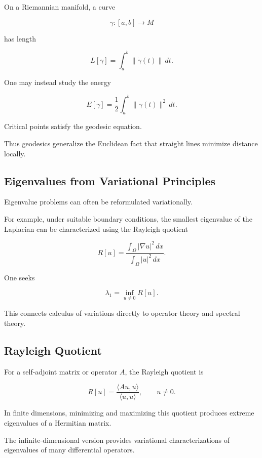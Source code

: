 On a Riemannian manifold, a curve

\[
\gamma:[a,b]\to M
\]

has length

\[
\boxed{
L[\gamma]
=
\int_a^b
\|\dot\gamma(t)\|\,dt.
}
\]

One may instead study the energy

\[
\boxed{
E[\gamma]
=
\frac12
\int_a^b
\|\dot\gamma(t)\|^2\,dt.
}
\]

Critical points satisfy the geodesic equation.

Thus geodesics generalize the Euclidean fact that straight lines minimize
distance locally.

\subsection{Eigenvalues from Variational Principles}
\label{subsec:eigenvalues-variational}

Eigenvalue problems can often be reformulated variationally.

For example, under suitable boundary conditions, the smallest eigenvalue
of the Laplacian can be characterized using the Rayleigh quotient

\[
\boxed{
R[u]
=
\frac{
\int_\Omega|\nabla u|^2\,dx
}{
\int_\Omega|u|^2\,dx
}.
}
\]

One seeks

\[
\boxed{
\lambda_1
=
\inf_{u\neq0}R[u].
}
\]

This connects calculus of variations directly to operator theory and
spectral theory.

\subsection{Rayleigh Quotient}
\label{subsec:rayleigh-quotient}

For a self-adjoint matrix or operator \(A\), the Rayleigh quotient is

\[
\boxed{
R[u]
=
\frac{\langle Au,u\rangle}
{\langle u,u\rangle},
\qquad
u\neq0.
}
\]

In finite dimensions, minimizing and maximizing this quotient produces
extreme eigenvalues of a Hermitian matrix.

The infinite-dimensional version provides variational characterizations
of eigenvalues of many differential operators.

